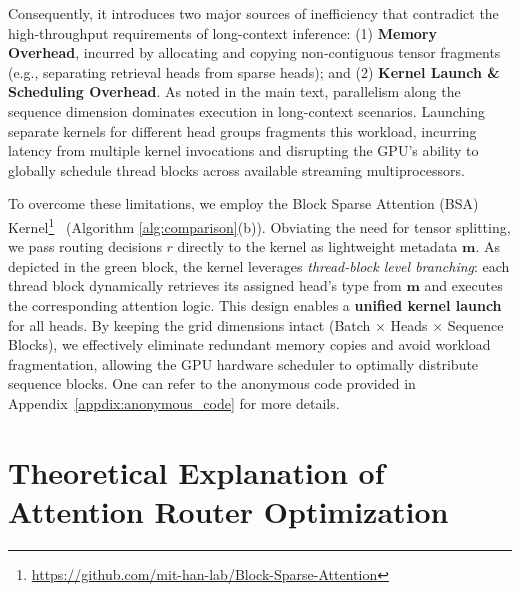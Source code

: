 Consequently, it introduces two major sources of inefficiency that contradict the high-throughput requirements of long-context inference:
(1) \textbf{Memory Overhead}, incurred by allocating and copying non-contiguous tensor fragments (e.g., separating retrieval heads from sparse heads); and 
(2) \textbf{Kernel Launch \& Scheduling Overhead}. As noted in the main text, parallelism along the sequence dimension dominates execution in long-context scenarios. Launching separate kernels for different head groups fragments this workload, incurring latency from multiple kernel invocations and disrupting the GPU's ability to globally schedule thread blocks across available streaming multiprocessors.

To overcome these limitations, we employ the Block Sparse Attention (BSA) Kernel\footnote{\url{https://github.com/mit-han-lab/Block-Sparse-Attention}}~\citep{guo2024blocksparse} (Algorithm \ref{alg:comparison}(b)). 
Obviating the need for tensor splitting, we pass routing decisions $r$ directly to the kernel as lightweight metadata $\mathbf{m}$. 
As depicted in the green block, the kernel leverages \textit{thread-block level branching}: each thread block dynamically retrieves its assigned head's type from $\mathbf{m}$ and executes the corresponding attention logic. 
This design enables a \textbf{unified kernel launch} for all heads. By keeping the grid dimensions intact (Batch $\times$ Heads $\times$ Sequence Blocks), we effectively eliminate redundant memory copies and avoid workload fragmentation, allowing the GPU hardware scheduler to optimally distribute sequence blocks.
One can refer to the anonymous code provided in Appendix~\ref{appdix:anonymous_code} for more details.




\section{Theoretical Explanation of Attention Router Optimization}
\label{appdix:theoretical_explan_attn_router}

